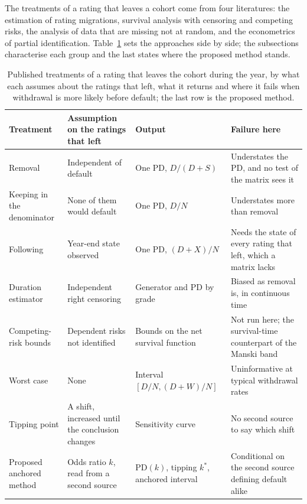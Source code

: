 The treatments of a rating that leaves a cohort come from four literatures: the estimation of rating migrations, survival analysis with censoring and competing risks, the analysis of data that are missing not at random, and the econometrics of partial identification. Table~\ref{tab:related} sets the approaches side by side; the subsections characterise each group and the last states where the proposed method stands.

\begin{table}[htbp]
\centering
\small
\caption{Published treatments of a rating that leaves the cohort during the year, by what each assumes about the ratings that left, what it returns and where it fails when withdrawal is more likely before default; the last row is the proposed method.}
\label{tab:related}
\begin{tabularx}{\textwidth}{p{3.1cm}XXX}
\toprule
Treatment & Assumption on the ratings that left & Output & Failure here \\
\midrule
Removal \citep{schuermann2004} & Independent of default & One PD, $D/(D+S)$ & Understates the PD, and no test of the matrix sees it \\
Keeping in the denominator & None of them would default & One PD, $D/N$ & Understates more than removal \\
Following \citep{eba2017} & Year-end state observed & One PD, $(D+X)/N$ & Needs the state of every rating that left, which a matrix lacks \\
Duration estimator \citep{lando2002} & Independent right censoring & Generator and PD by grade & Biased as removal is, in continuous time \\
Competing-risk bounds \citep{peterson1976} & Dependent risks not identified \citep{tsiatis1975} & Bounds on the net survival function & Not run here; the survival-time counterpart of the Manski band \\
Worst case \citep{manski1989} & None & Interval $[D/N,(D+W)/N]$ & Uninformative at typical withdrawal rates \\
Tipping point \citep{cro2020} & A shift, increased until the conclusion changes & Sensitivity curve & No second source to say which shift \\
Proposed anchored method & Odds ratio $k$, read from a second source & PD$(k)$, tipping $k^{*}$, anchored interval & Conditional on the second source defining default alike \\
\bottomrule
\end{tabularx}
\end{table}

